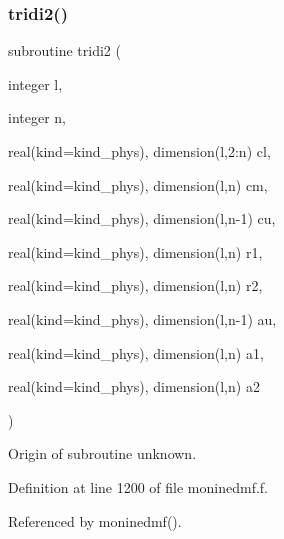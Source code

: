 \subsubsection{\texorpdfstring{tridi2()}{tridi2()}}
{\footnotesize\ttfamily subroutine tridi2 (\begin{DoxyParamCaption}\item[{integer}]{l,  }\item[{integer}]{n,  }\item[{real(kind=kind\+\_\+phys), dimension(l,2\+:n)}]{cl,  }\item[{real(kind=kind\+\_\+phys), dimension(l,n)}]{cm,  }\item[{real(kind=kind\+\_\+phys), dimension(l,n-\/1)}]{cu,  }\item[{real(kind=kind\+\_\+phys), dimension(l,n)}]{r1,  }\item[{real(kind=kind\+\_\+phys), dimension(l,n)}]{r2,  }\item[{real(kind=kind\+\_\+phys), dimension(l,n-\/1)}]{au,  }\item[{real(kind=kind\+\_\+phys), dimension(l,n)}]{a1,  }\item[{real(kind=kind\+\_\+phys), dimension(l,n)}]{a2 }\end{DoxyParamCaption})}

Origin of subroutine unknown. 

Definition at line 1200 of file moninedmf.\+f.



Referenced by moninedmf().

